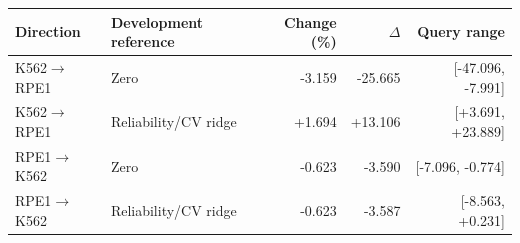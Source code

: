 \begin{tabular}{llrrr}
\toprule
Direction & Development reference & Change (\%) & $\Delta$ & Query range \\
\midrule
K562$\to$RPE1 & Zero & -3.159 & -25.665 & [-47.096, -7.991] \\
K562$\to$RPE1 & Reliability/CV ridge & +1.694 & +13.106 & [+3.691, +23.889] \\
RPE1$\to$K562 & Zero & -0.623 & -3.590 & [-7.096, -0.774] \\
RPE1$\to$K562 & Reliability/CV ridge & -0.623 & -3.587 & [-8.563, +0.231] \\
\bottomrule
\end{tabular}
